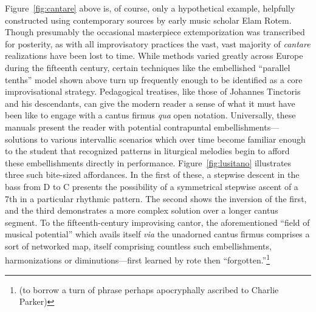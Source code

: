     Figure~\ref{fig:cantare} above is, of course, only a hypothetical example, helpfully constructed using contemporary sources by early music scholar Elam Rotem. Though presumably the occasional masterpiece extemporization was transcribed for posterity, as with all improvisatory practices the vast, vast majority of \textit{cantare} realizations have been lost to time. While methods varied greatly across Europe during the fifteenth century, certain techniques like the embellished ``parallel tenths'' model shown above turn up frequently enough to be identified as a core improvisational strategy.\autocite{Rotem_2022} Pedagogical treatises, like those of Johannes Tinctoris and his descendants, can give the modern reader a sense of what it must have been like to engage with a cantus firmus \textit{qua} open notation. Universally, these manuals present the reader with potential contrapuntal embellishments---solutions to various intervallic scenarios which over time become familiar enough to the student that recognized patterns in liturgical melodies begin to afford these embellishments directly in performance. Figure~\ref{fig:lusitano} illustrates three such bite-sized affordances. In the first of these, a stepwise descent in the bass from D to C presents the possibility of a symmetrical stepwise ascent of a 7th in a particular rhythmic pattern. The second shows the inversion of the first, and the third demonstrates a more complex solution over a longer cantus segment. To the fifteenth-century improvising cantor, the aforementioned ``field of musical potential'' which avails itself \textit{via} the unadorned cantus firmus comprises a sort of networked map, itself comprising countless such embellishments, harmonizations or diminutions---first learned by rote then ``forgotten.''\footnote{(to borrow a turn of phrase perhaps apocryphally ascribed to Charlie Parker)}

